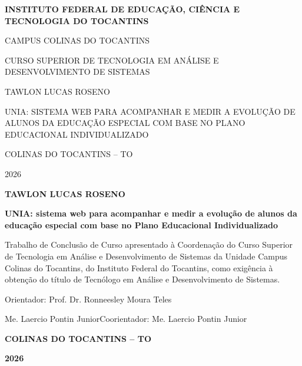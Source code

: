 \documentclass[12pt, oneside, a4paper, chapter=TITLE, english, brazil]{abntex2}
\newcommand{\orientadorTCC}{Prof. Dr. Ronneesley Moura Teles}
\def\coorientadorTCC{Me. Laercio Pontin Junior}
\newcommand{\autorTCC}{TAWLON LUCAS ROSENO}
\newcommand{\naturezaTCC}{Trabalho de Conclusão de Curso apresentado à Coordenação do Curso
  Superior de Tecnologia em Análise e Desenvolvimento de Sistemas da Unidade Campus Colinas do
  Tocantins, do Instituto Federal do Tocantins, como exigência à obtenção do título de
  Tecnólogo em Análise e Desenvolvimento de Sistemas.}
\newcommand{\localTCC}{COLINAS DO TOCANTINS -- TO}
\newcommand{\anoTCC}{2026}
\newcommand{\blocoNatureza}[1]{%
  \hspace*{\fill}\begin{minipage}{8cm}\SingleSpacing\setlength{\parindent}{0pt}#1\end{minipage}\par}
\begin{document}
\frenchspacing

\pretextual

\begin{capa}
  \centering\bfseries
  INSTITUTO FEDERAL DE EDUCAÇÃO, CIÊNCIA E TECNOLOGIA DO TOCANTINS\par
  CAMPUS COLINAS DO TOCANTINS\par
  CURSO SUPERIOR DE TECNOLOGIA EM ANÁLISE E DESENVOLVIMENTO DE SISTEMAS\par
  \autorTCC\par
  UNIA: SISTEMA WEB PARA ACOMPANHAR E MEDIR A EVOLUÇÃO DE ALUNOS DA EDUCAÇÃO ESPECIAL COM BASE
  NO PLANO EDUCACIONAL INDIVIDUALIZADO\par
  \localTCC\par
  \anoTCC\par
\end{capa}

\begin{center}
  \textbf{\autorTCC}
\end{center}
\begin{center}
  \textbf{UNIA: sistema web para acompanhar e medir a evolução de alunos da educação especial com
  base no Plano Educacional Individualizado}
\end{center}
\blocoNatureza{\naturezaTCC\par\vspace{\baselineskip}
  {\raggedright Orientador: \orientadorTCC\par
  \ifx\coorientadorTCC\empty\else Coorientador: \coorientadorTCC\par\fi}}
\begin{center}
  \textbf{\localTCC}\par
  \textbf{\anoTCC}
\end{center}
\newpage

\end{document}
